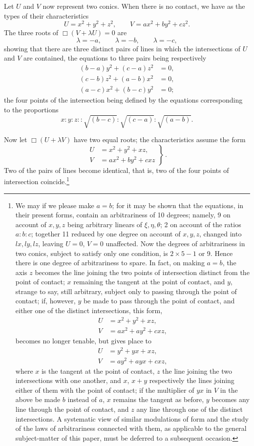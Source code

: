 \documentclass[11pt]{article}
\newcommand{\sourcepage}[1]{\marginpar{\scriptsize p.~#1}}
\begin{document}
{{\sourcepage{223}
Let $U$ and $V$ now represent two conics. When there is no contact, we have as the types of their characteristics
\[
U=x^2+y^2+z^2,
\qquad
V=ax^2+by^2+cz^2.
\]
The three roots of $\Box(V+\lambda U)=0$ are
\[
\lambda=-a,
\qquad
\lambda=-b,
\qquad
\lambda=-c,
\]
showing that there are three distinct pairs of lines in which the intersections of $U$ and $V$ are contained, the equations to three pairs being respectively
\[
\begin{aligned}
(b-a)y^2+(c-a)z^2&=0,\\
(c-b)z^2+(a-b)x^2&=0,\\
(a-c)x^2+(b-c)y^2&=0;
\end{aligned}
\]
the four points of the intersection being defined by the equations corresponding to the proportions
\[
x:y:z::\sqrt{(b-c)}:\sqrt{(c-a)}:\sqrt{(a-b)}.
\]

Now let $\Box(U+\lambda V)$ have two equal roots; the characteristics assume the form
\[
\left.\begin{aligned}
U&=x^2+y^2+xz,\\
V&=ax^2+by^2+cxz
\end{aligned}\right\}\, .
\]
Two of the pairs of lines become identical, that is, two of the four points of intersection coincide.\footnote{We may if we please make $a=b$; for it may be shown that the equations, in their present forms, contain an arbitrariness of 10 degrees; namely, 9 on account of $x,y,z$ being arbitrary linears of $\xi,\eta,\theta$; 2 on account of the ratios $a:b:c$; together 11 reduced by one degree on account of $x,y,z$, changed into $lx,ly,lz$, leaving $U=0$, $V=0$ unaffected. Now the degrees of arbitrariness in two conics, subject to satisfy only one condition, is $2\times5-1$ or 9. Hence there is one degree of arbitrariness to spare. In fact, on making $a=b$, the axis $z$ becomes the line joining the two points of intersection distinct from the point of contact; $x$ remaining the tangent at the point of contact, and $y$, strange to say, still arbitrary, subject only to passing through the point of contact; if, however, $y$ be made to pass through the point of contact, and either one of the distinct intersections, this form,
\[
\begin{aligned}
U&=x^2+y^2+xz,\\
V&=ax^2+ay^2+cxz,
\end{aligned}
\]
becomes no longer tenable, but gives place to
\[
\begin{aligned}
U&=y^2+yx+xz,\\
V&=ay^2+ayx+cxz,
\end{aligned}
\]
where $x$ is the tangent at the point of contact, $z$ the line joining the two intersections with one another, and $x$, $x+y$ respectively the lines joining either of them with the point of contact; if the multiplier of $yx$ in $V$ in the above be made $b$ instead of $a$, $x$ remains the tangent as before, $y$ becomes any line through the point of contact, and $z$ any line through one of the distinct intersections. A systematic view of similar modulations of form and the study of the laws of arbitrariness connected with them, as applicable to the general subject-matter of this paper, must be deferred to a subsequent occasion.}

}}
\end{document}
